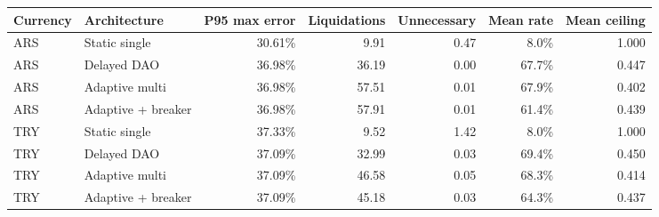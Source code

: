 \begin{tabular}{llrrrrr}
\toprule
Currency & Architecture & P95 max error & Liquidations & Unnecessary & Mean rate & Mean ceiling \\
\midrule
ARS & Static single & 30.61\% & 9.91 & 0.47 & 8.0\% & 1.000 \\
ARS & Delayed DAO & 36.98\% & 36.19 & 0.00 & 67.7\% & 0.447 \\
ARS & Adaptive multi & 36.98\% & 57.51 & 0.01 & 67.9\% & 0.402 \\
ARS & Adaptive + breaker & 36.98\% & 57.91 & 0.01 & 61.4\% & 0.439 \\
TRY & Static single & 37.33\% & 9.52 & 1.42 & 8.0\% & 1.000 \\
TRY & Delayed DAO & 37.09\% & 32.99 & 0.03 & 69.4\% & 0.450 \\
TRY & Adaptive multi & 37.09\% & 46.58 & 0.05 & 68.3\% & 0.414 \\
TRY & Adaptive + breaker & 37.09\% & 45.18 & 0.03 & 64.3\% & 0.437 \\
\bottomrule
\end{tabular}
